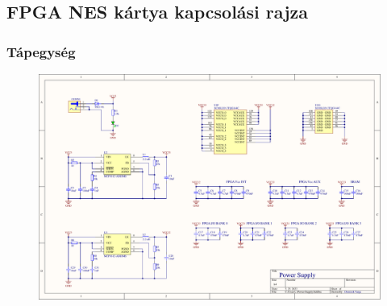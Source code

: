 \appendix
\chapter*{\fuggelek}
\setcounter{chapter}{\appendixnumber}

\newpage
\section{FPGA NES kártya kapcsolási rajza}
\subsection{Tápegység}
\begin{figure}[H]
	\centering
	\includegraphics[width=220mm, keepaspectratio, angle=90]{figures/PSU}
	\label{fig:PSU}
\end{figure}
